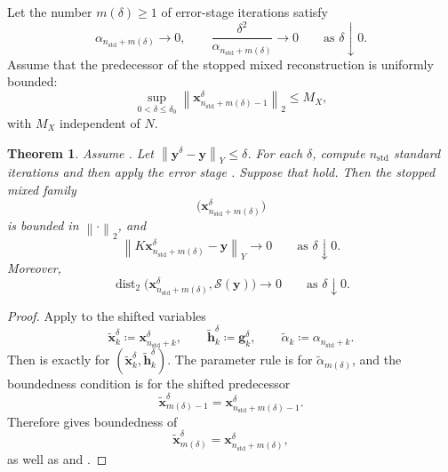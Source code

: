 \documentclass{article}
\newtheorem{theorem}{Theorem}[section]
\theoremstyle{remark}
\newcommand{\norm}[1]{\left\lVert #1 \right\rVert}
\newcommand{\Ssol}{\mathcal{S}}
\newcommand{\bx}{{\bm{x}}}
\newcommand{\by}{{\bm{y}}}
\newcommand{\bh}{{\bm{h}}}
\newcommand{\bg}{{\bm{g}}}
\begin{document}
Let the number \(m(\delta)\ge1\) of error-stage iterations satisfy
\begin{equation}\label{eq:mixed-apriori-rule}
\alpha_{n_{\mathrm{std}}+m(\delta)}\to0,
\qquad
\frac{\delta^2}{\alpha_{n_{\mathrm{std}}+m(\delta)}}\to0
\qquad\text{as }\delta\downarrow0 .
\end{equation}
Assume that the predecessor of the stopped mixed reconstruction is uniformly
bounded:
\begin{equation}\label{eq:mixed-noisy-bounded}
\sup_{0<\delta\le\delta_0}
\norm{\bx_{n_{\mathrm{std}}+m(\delta)-1}^\delta}_2
\le M_X,
\end{equation}
with \(M_X\) independent of \(N\).

\begin{theorem}
\label{thm:mixed-noisy-convergence}
Assume . Let
\(\norm{\by^\delta-\by}_Y\le\delta\). For each \(\delta\), compute
\(n_{\mathrm{std}}\) standard iterations and then apply the error stage
. Suppose that
 hold. Then the stopped mixed
family
\[
\bigl(\bx_{n_{\mathrm{std}}+m(\delta)}^\delta\bigr)
\]
is bounded in \(\norm{\cdot}_2\), and
\begin{equation}\label{eq:mixed-residual-convergence}
\norm{K\bx_{n_{\mathrm{std}}+m(\delta)}^\delta-\by}_Y\to0
\qquad\text{as }\delta\downarrow0.
\end{equation}
Moreover,
\begin{equation}\label{eq:mixed-set-convergence}
\operatorname{dist}_2
\bigl(\bx_{n_{\mathrm{std}}+m(\delta)}^\delta,\Ssol(\by)\bigr)
\to0
\qquad\text{as }\delta\downarrow0 .
\end{equation}
\end{theorem}

\begin{proof}
Apply  to the shifted variables
\[
\widetilde\bx_k^\delta
\coloneqq
\bx_{n_{\mathrm{std}}+k}^\delta,
\qquad
\widetilde\bh_k^\delta
\coloneqq
\bg_k^\delta,
\qquad
\widetilde\alpha_k
\coloneqq
\alpha_{n_{\mathrm{std}}+k}.
\]
Then  is exactly
 for
\((\widetilde\bx_k^\delta,\widetilde\bh_k^\delta)\). The parameter rule
 is  for
\(\widetilde\alpha_{m(\delta)}\), and the boundedness condition
 is  for the shifted
predecessor
\[
\widetilde\bx_{m(\delta)-1}^\delta
=
\bx_{n_{\mathrm{std}}+m(\delta)-1}^\delta .
\]
Therefore  gives boundedness of
\[
\widetilde\bx_{m(\delta)}^\delta
=
\bx_{n_{\mathrm{std}}+m(\delta)}^\delta,
\]
as well as  and
.
\end{proof}
\end{document}
